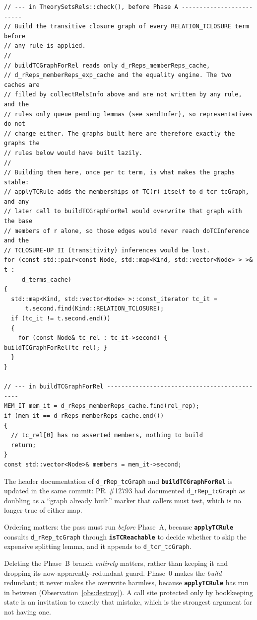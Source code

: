 \documentclass[11pt,a4paper]{article}
\newcommand{\code}[1]{\texttt{\small #1}}
\newcommand{\fn}[1]{\texttt{\small\bfseries #1}}
\theoremstyle{definition}
\begin{document}
\begin{lstlisting}
// --- in TheorySetsRels::check(), before Phase A -------------------------
// Build the transitive closure graph of every RELATION_TCLOSURE term before
// any rule is applied.
//
// buildTCGraphForRel reads only d_rReps_memberReps_cache,
// d_rReps_memberReps_exp_cache and the equality engine. The two caches are
// filled by collectRelsInfo above and are not written by any rule, and the
// rules only queue pending lemmas (see sendInfer), so representatives do not
// change either. The graphs built here are therefore exactly the graphs the
// rules below would have built lazily.
//
// Building them here, once per tc term, is what makes the graphs stable:
// applyTCRule adds the memberships of TC(r) itself to d_tcr_tcGraph, and any
// later call to buildTCGraphForRel would overwrite that graph with the base
// members of r alone, so those edges would never reach doTCInference and the
// TCLOSURE-UP II (transitivity) inferences would be lost.
for (const std::pair<const Node, std::map<Kind, std::vector<Node> > >& t :
     d_terms_cache)
{
  std::map<Kind, std::vector<Node> >::const_iterator tc_it =
      t.second.find(Kind::RELATION_TCLOSURE);
  if (tc_it != t.second.end())
  {
    for (const Node& tc_rel : tc_it->second) { buildTCGraphForRel(tc_rel); }
  }
}

// --- in buildTCGraphForRel ---------------------------------------------
MEM_IT mem_it = d_rReps_memberReps_cache.find(rel_rep);
if (mem_it == d_rReps_memberReps_cache.end())
{
  // tc_rel[0] has no asserted members, nothing to build
  return;
}
const std::vector<Node>& members = mem_it->second;
\end{lstlisting}

\noindent
The header documentation of \code{d\_rRep\_tcGraph} and \fn{buildTCGraphForRel}
is updated in the same commit: PR~\#12793 had documented \code{d\_rRep\_tcGraph}
as doubling as a ``graph already built'' marker that callers must test, which is
no longer true of either map.

\noindent
Ordering matters: the pass must run \emph{before} Phase~A, because
\fn{applyTCRule} consults \code{d\_rRep\_tcGraph} through \fn{isTCReachable} to
decide whether to skip the expensive splitting lemma, and it appends to
\code{d\_tcr\_tcGraph}.

\noindent
Deleting the Phase~B branch \emph{entirely} matters, rather than keeping it and
dropping its now-apparently-redundant guard. Phase~0 makes the \emph{build}
redundant; it never makes the overwrite harmless, because \fn{applyTCRule} has
run in between (Observation~\ref{obs:destroy}). A call site protected only by
bookkeeping state is an invitation to exactly that mistake, which is the
strongest argument for not having one.
\end{document}
